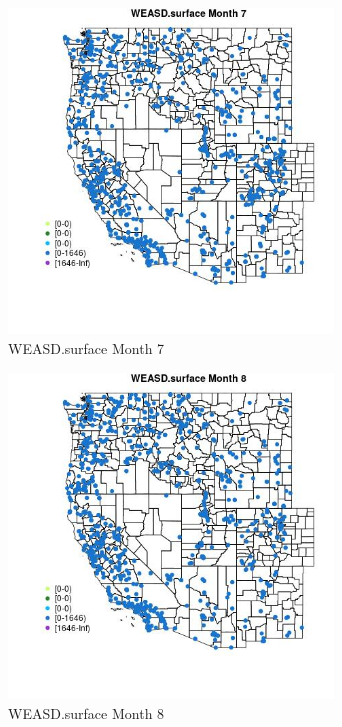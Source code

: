 \begin{figure} 
\centering  
\includegraphics[width=0.77\textwidth]{Code_Outputs/Report_ML_input_PM25_Step4_part_e_de_duplicated_aves_compiled_2019-05-21wNAs_MapObsMo7WEASDsurface.jpg} 
\caption{\label{fig:Report_ML_input_PM25_Step4_part_e_de_duplicated_aves_compiled_2019-05-21wNAsMapObsMo7WEASDsurface}WEASD.surface Month 7} 
\end{figure} 
 

\begin{figure} 
\centering  
\includegraphics[width=0.77\textwidth]{Code_Outputs/Report_ML_input_PM25_Step4_part_e_de_duplicated_aves_compiled_2019-05-21wNAs_MapObsMo8WEASDsurface.jpg} 
\caption{\label{fig:Report_ML_input_PM25_Step4_part_e_de_duplicated_aves_compiled_2019-05-21wNAsMapObsMo8WEASDsurface}WEASD.surface Month 8} 
\end{figure} 
 

